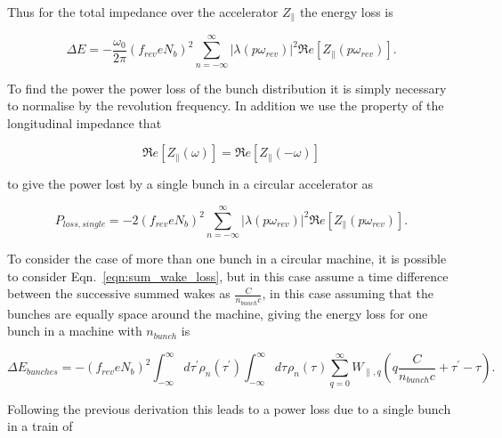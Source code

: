 Thus for the total impedance over the accelerator $Z_{\parallel}$ the energy loss is

\begin{equation}
\Delta E = -\frac{\omega_{0}}{2\pi} \left( f_{rev} e N_{b}\right)^{2} \displaystyle\sum\limits_{n = -\infty}^{\infty}  \left| \lambda \left( p \omega_{rev} \right)  \right|^{2} \Re{}e \left[ Z_{\parallel} \left( p \omega_{rev} \right) \right].
\end{equation}

To find the power the power loss of the bunch distribution it is simply necessary to normalise by the revolution frequency. In addition we use the property of the longitudinal impedance that 

\begin{equation}
\Re{}e \left[ Z_{\parallel} \left( \omega \right) \right] =  \Re{}e \left[ Z_{\parallel} \left( -\omega \right) \right]
\end{equation}

to give the power lost by a single bunch in a circular accelerator as 

\begin{equation}
P_{loss, single} = - 2 \left( f_{rev} e N_{b}\right)^{2} \displaystyle\sum\limits_{n = -\infty}^{\infty}  \left| \lambda \left( p \omega_{rev} \right)  \right|^{2} \Re{}e \left[ Z_{\parallel} \left( p \omega_{rev} \right) \right].
\label{eqn:power_loss_single_bunch}
\end{equation}

To consider the case of more than one bunch in a circular machine, it is possible to consider Eqn.~\ref{eqn:sum_wake_loss}, but in this case assume a time difference between the successive summed wakes as $\frac{C}{n_{bunch}c}$, in this case assuming that the bunches are equally space around the machine, giving the energy loss for one bunch in a machine with $n_{bunch}$ is 

\begin{equation}
\Delta E_{bunches} = - \left( f_{rev} e  N_{b}\right)^{2} \int^{\infty}_{-\infty} d\tau^{'} \rho_{n} \left( \tau^{'} \right) \int^{\infty}_{-\infty} d\tau^{} \rho_{n} \left( \tau^{} \right) \displaystyle\sum\limits_{q = 0}^{\infty} W_{\parallel, q} \left( q\frac{C}{n_{bunch}c} + \tau^{'} - \tau \right).  
\label{eqn:sum_wake_loss_bunches}
\end{equation}

Following the previous derivation this leads to a power loss due to a single bunch in a train of 


